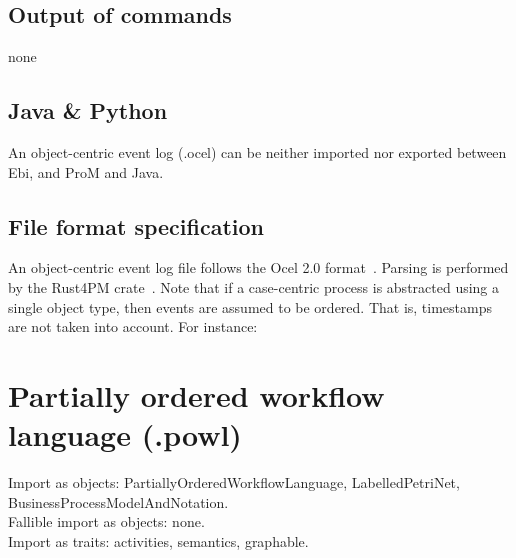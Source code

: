 {\subsection*{Output of commands} none
\subsection*{Java \& Python}
An object-centric event log (.ocel) can be neither imported nor exported between Ebi, and ProM and Java.
\subsection*{File format specification}An object-centric event log file follows the Ocel 2.0 format~\cite{DBLP:journals/corr/abs-2403-01975}. 
Parsing is performed by the Rust4PM crate~\cite{DBLP:conf/bpm/KustersA24}.
Note that if a case-centric process is abstracted using a single object type, then events are assumed to be ordered. 
That is, timestamps are not taken into account.
For instance:
    
\clearpage
\section{Partially ordered workflow language (.powl)}
\label{filehandler:partially ordered workflow language}
Import as objects: PartiallyOrderedWorkflowLanguage, LabelledPetriNet, BusinessProcessModelAndNotation.
\\Fallible import as objects: none.
\\Import as traits: activities, semantics, graphable.
}
